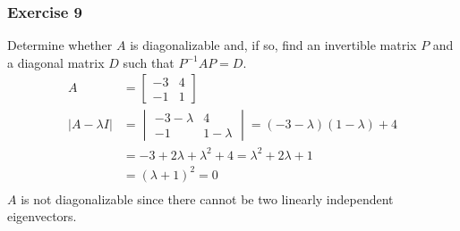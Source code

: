 \documentclass{math}
\begin{document}
\subsubsection*{Exercise 9}
Determine whether \( A \) is diagonalizable and, if so, find an invertible
matrix \( P \) and a diagonal matrix \( D \) such that \( P^{-1}AP = D \).
\begin{align*}
  A &= \begin{bmatrix}-3 & 4 \\ -1 & 1\end{bmatrix} \\
  |A-\lambda I| &= \begin{vmatrix}
    -3-\lambda & 4 \\
    -1 & 1-\lambda
  \end{vmatrix} = (-3-\lambda)(1-\lambda)+4 \\
  &= -3+2\lambda+\lambda^2+4 = \lambda^2+2\lambda+1 \\
  &= (\lambda+1)^2 = 0 \\
\end{align*}
\( A \) is not diagonalizable since there cannot be two linearly independent
eigenvectors.
\end{document}
